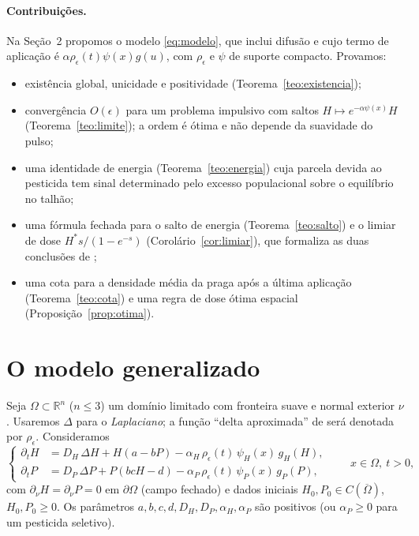 \documentclass[11pt,a4paper]{article}
\numberwithin{equation}{section}
\theoremstyle{definition}
\theoremstyle{remark}
\newcommand{\R}{\mathbb{R}}
\newcommand{\Hs}{H^{*}}
\begin{document}
\paragraph{Contribuições.}
Na Seção~2 propomos o modelo \eqref{eq:modelo}, que inclui difusão e cujo termo de
aplicação é $\alpha\rho_\epsilon(t)\psi(x)g(u)$, com $\rho_\epsilon$ e $\psi$ de suporte compacto.
Provamos:
\begin{itemize}
\item existência global, unicidade e positividade (Teorema~\ref{teo:existencia});
\item convergência $O(\epsilon)$ para um problema impulsivo com saltos
$H\mapsto e^{-\alpha\psi(x)}H$ (Teorema~\ref{teo:limite}); a ordem é ótima e não depende da
suavidade do pulso;
\item uma identidade de energia (Teorema~\ref{teo:energia}) cuja parcela devida ao pesticida
tem sinal determinado pelo excesso populacional sobre o equilíbrio no talhão;
\item uma fórmula fechada para o salto de energia (Teorema~\ref{teo:salto}) e o
limiar de dose $\Hs s/(1-e^{-s})$ (Corolário~\ref{cor:limiar}), que formaliza as duas
conclusões de \cite{LiYang};
\item uma cota para a densidade média da praga após a última aplicação
(Teorema~\ref{teo:cota}) e uma regra de dose ótima espacial (Proposição~\ref{prop:otima}).
\end{itemize}

\section{O modelo generalizado}

Seja $\Omega\subset\R^n$ ($n\le3$) um domínio limitado com fronteira suave e normal
exterior $\nu$. Usaremos $\Delta$ para o \emph{Laplaciano}; a função
``delta aproximada'' de \cite{LiYang} será denotada por $\rho_\epsilon$. Consideramos
\begin{equation}\label{eq:modelo}
\left\{
\begin{aligned}
\partial_t H &= D_H\,\Delta H + H(a-bP) - \alpha_H\,\rho_\epsilon(t)\,\psi_H(x)\,g_H(H),\\
\partial_t P &= D_P\,\Delta P + P(bcH-d) - \alpha_P\,\rho_\epsilon(t)\,\psi_P(x)\,g_P(P),
\end{aligned}\right.
\qquad x\in\Omega,\ t>0,
\end{equation}
com $\partial_\nu H=\partial_\nu P=0$ em $\partial\Omega$ (campo fechado) e dados iniciais
$H_0,P_0\in C(\overline\Omega)$, $H_0,P_0\ge0$. Os parâmetros $a,b,c,d,D_H,D_P,\alpha_H,\alpha_P$
são positivos (ou $\alpha_P\ge0$ para um pesticida seletivo).
\end{document}
